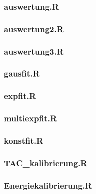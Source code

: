 \documentclass[12pt]{article}
\begin{document}
\subsubsection*{auswertung.R}\label{auswertung1r}

\subsubsection*{auswertung2.R}\label{auswertung2}

\subsubsection*{auswertung3.R}\label{auswertung3}

\subsubsection*{gausfit.R}\label{gausift}

\subsubsection*{expfit.R}\label{expfit}

\subsubsection*{multiexpfit.R}\label{multiexpfit}

\subsubsection*{konstfit.R}\label{konstfit}

\subsubsection*{TAC\_kalibrierung.R}\label{tac}

\subsubsection*{Energiekalibrierung.R}\label{energie}



%


%
\end{document}
